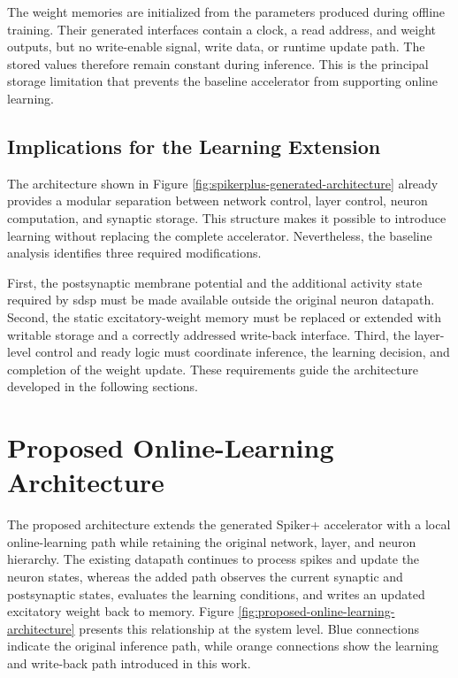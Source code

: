 The weight memories are initialized from the parameters produced during offline training. Their generated interfaces contain a clock, a read address, and weight outputs, but no write-enable signal, write data, or runtime update path. The stored values therefore remain constant during inference. This is the principal storage limitation that prevents the baseline accelerator from supporting online learning.

\subsection{Implications for the Learning Extension}

The architecture shown in Figure \ref{fig:spikerplus-generated-architecture} already provides a modular separation between network control, layer control, neuron computation, and synaptic storage. This structure makes it possible to introduce learning without replacing the complete accelerator. Nevertheless, the baseline analysis identifies three required modifications.

First, the postsynaptic membrane potential and the additional activity state required by \gls{sdsp} must be made available outside the original neuron datapath. Second, the static excitatory-weight memory must be replaced or extended with writable storage and a correctly addressed write-back interface. Third, the layer-level control and ready logic must coordinate inference, the learning decision, and completion of the weight update. These requirements guide the architecture developed in the following sections.

\section{Proposed Online-Learning Architecture}
\label{subsec: proposed online learning architecture}

The proposed architecture extends the generated Spiker+ accelerator with a local online-learning path while retaining the original network, layer, and neuron hierarchy. The existing datapath continues to process spikes and update the neuron states, whereas the added path observes the current synaptic and postsynaptic states, evaluates the learning conditions, and writes an updated excitatory weight back to memory. Figure \ref{fig:proposed-online-learning-architecture} presents this relationship at the system level. Blue connections indicate the original inference path, while orange connections show the learning and write-back path introduced in this work.

